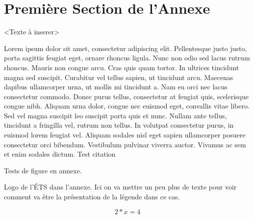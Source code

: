\documentclass[letterpaper, twoside, 12pt, memoire, creativecommons, hyperref]{thETS}
\begin{document}
\section{Première Section de l'Annexe}
<Texte à inserer> 

Lorem ipsum dolor sit amet, consectetur adipiscing elit. Pellentesque justo justo, porta sagittis feugiat eget, ornare rhoncus ligula. Nunc non odio sed lacus rutrum rhoncus. Mauris non congue arcu. Cras quis quam tortor. In ultrices tincidunt magna sed suscipit. Curabitur vel tellus sapien, ut tincidunt arcu. Maecenas dapibus ullamcorper urna, ut mollis mi tincidunt a. Nam eu orci nec lacus consectetur commodo. Donec purus tellus, consectetur at feugiat quis, scelerisque congue nibh. Aliquam urna dolor, congue nec euismod eget, convallis vitae libero. Sed vel magna suscipit leo suscipit porta quis et nunc. Nullam ante tellus, tincidunt a fringilla vel, rutrum non tellus. In volutpat consectetur purus, in euismod lorem feugiat vel. Aliquam sodales nisl eget sapien ullamcorper posuere consectetur orci bibendum. Vestibulum pulvinar viverra auctor. Vivamus ac sem et enim sodales dictum. Test citation \cite{Bha10}

Tests de figure en annexe.

%

\begin{figureap}[ht]
	\caption{Logo de l'ÉTS dans l'annexe. Ici on va mettre un peu plus de texte pour voir comment va être la présentation de
	la légende dans ce cas.}
	\label{fig:testap}
\end{figureap}
\begin{center}
\begin{equation} 
2*x=4 
\end{equation}
\end{center}
\end{document}
